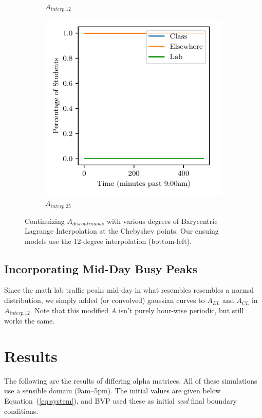 \documentclass[11pt]{amsart}
\begin{document}
\begin{figure}[htp]
\begin{subfigure}[b]{0.32\textwidth}
        \caption{$A_{interp.12}$}
        \label{fig:interp_degrees_12}
    \end{subfigure}
    \hfill
    \begin{subfigure}[b]{0.32\textwidth}
        \includegraphics[width=\textwidth]{temp.pdf}
        \caption{$A_{interp.25}$}
        \label{fig:interp_degrees_25}
    \end{subfigure}
    \caption{Continuizing $A_{discontinuous}$ with various degrees of Barycentric Lagrange Interpolation 
    at the Chebyshev points. Our ensuing models use the 12-degree interpolation (bottom-left).}
    \label{fig:interp_degrees}
\end{figure}

\subsection{Incorporating Mid-Day Busy Peaks}
Since the math lab traffic peaks mid-day in what resembles
resembles a normal distribution, we simply added (or convolved) gaussian curves to $A_{EL}$ and $A_{CL}$ in $A_{interp.12}$.
Note that this modified $A$ isn't purely hour-wise periodic, but still works the same.

\section{Results}
The following are the results of differing alpha matrices. All of these simulations use a sensible domain (9am–5pm). The initial values are 
given below Equation~(\ref{eq:system}), and BVP used these as initial \textit{and} final boundary conditions.
\end{document}
